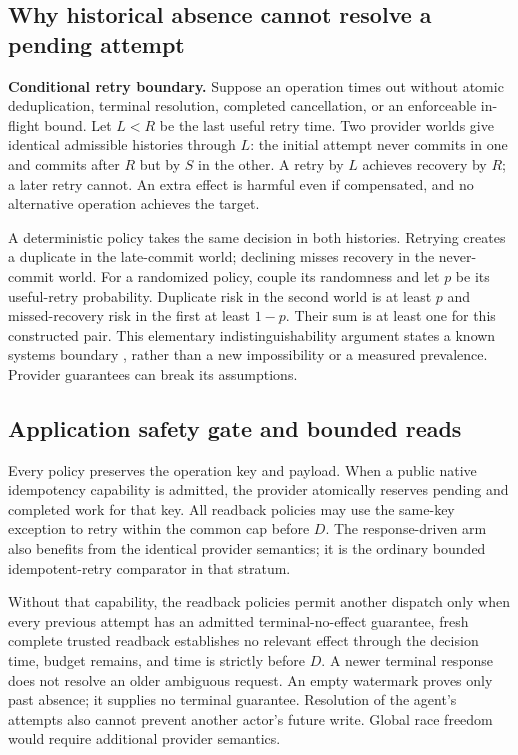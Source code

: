 \documentclass[conference]{IEEEtran}
\begin{document}
\subsection{Why historical absence cannot resolve a pending attempt}

\textbf{Conditional retry boundary.} Suppose an operation times out without atomic deduplication, terminal resolution, completed cancellation, or an enforceable in-flight bound. Let $L<R$ be the last useful retry time. Two provider worlds give identical admissible histories through $L$: the initial attempt never commits in one and commits after $R$ but by $S$ in the other. A retry by $L$ achieves recovery by $R$; a later retry cannot. An extra effect is harmful even if compensated, and no alternative operation achieves the target.

A deterministic policy takes the same decision in both histories. Retrying creates a duplicate in the late-commit world; declining misses recovery in the never-commit world. For a randomized policy, couple its randomness and let $p$ be its useful-retry probability. Duplicate risk in the second world is at least $p$ and missed-recovery risk in the first at least $1-p$. Their sum is at least one for this constructed pair. This elementary indistinguishability argument states a known systems boundary \cite{limbo}, rather than a new impossibility or a measured prevalence. Provider guarantees can break its assumptions.

\subsection{Application safety gate and bounded reads}

Every policy preserves the operation key and payload. When a public native idempotency capability is admitted, the provider atomically reserves pending and completed work for that key. All readback policies may use the same-key exception to retry within the common cap before $D$. The response-driven arm also benefits from the identical provider semantics; it is the ordinary bounded idempotent-retry comparator in that stratum.

Without that capability, the readback policies permit another dispatch only when every previous attempt has an admitted terminal-no-effect guarantee, fresh complete trusted readback establishes no relevant effect through the decision time, budget remains, and time is strictly before $D$. A newer terminal response does not resolve an older ambiguous request. An empty watermark proves only past absence; it supplies no terminal guarantee. Resolution of the agent's attempts also cannot prevent another actor's future write. Global race freedom would require additional provider semantics.
\end{document}

